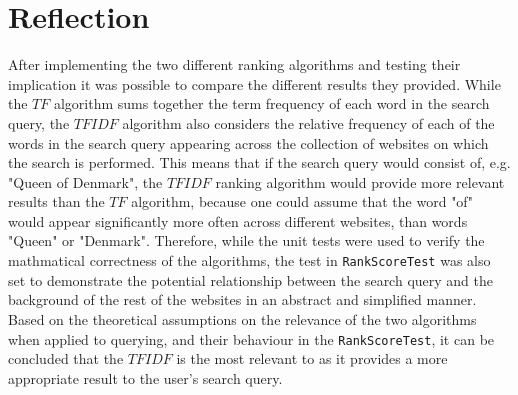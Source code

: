 \section{Reflection}
After implementing the two different ranking algorithms and testing their implication it was possible to compare the different results they provided. While the $TF$ algorithm sums together the term frequency of each word in the search query, the $TFIDF$ algorithm also considers the relative frequency of each of the words in the search query appearing across the collection of websites on which the search is performed. This means that if the search query would consist of, e.g. "Queen of Denmark", the $TFIDF$ ranking algorithm would provide more relevant results than the $TF$ algorithm, because one could assume that the word "of" would appear significantly more often across different websites, than words "Queen" or "Denmark". Therefore, while the unit tests were used to verify the mathmatical correctness of the algorithms, the test in {\tt RankScoreTest} was also set to demonstrate the potential relationship between the search query and the background of the rest of the websites in an abstract and simplified manner.\\
Based on the theoretical assumptions on the relevance of the two algorithms when applied to querying, and their behaviour in the {\tt RankScoreTest}, it can be concluded that the $TFIDF$ is the most relevant to as it provides a more appropriate result to the user's search query.